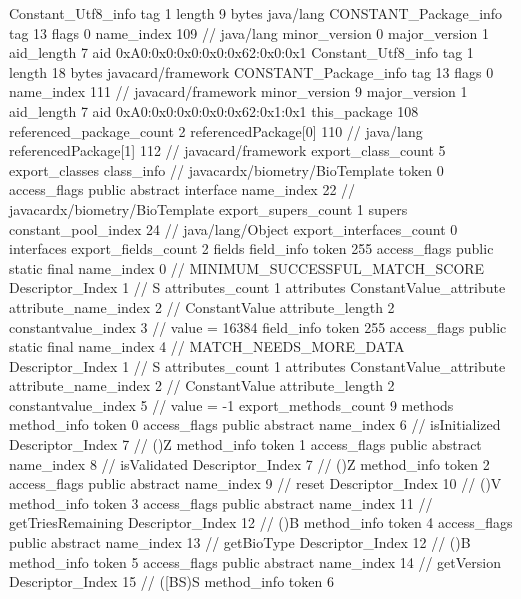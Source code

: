 {{{		}
		Constant_Utf8_info {
			tag	1
			length	9
			bytes	java/lang
		}
		CONSTANT_Package_info {
			tag	13
			flags	0
			name_index	109		// java/lang
			minor_version	0
			major_version	1
			aid_length	7
			aid	0xA0:0x0:0x0:0x0:0x62:0x0:0x1
		}
		Constant_Utf8_info {
			tag	1
			length	18
			bytes	javacard/framework
		}
		CONSTANT_Package_info {
			tag	13
			flags	0
			name_index	111		// javacard/framework
			minor_version	9
			major_version	1
			aid_length	7
			aid	0xA0:0x0:0x0:0x0:0x62:0x1:0x1
		}
	}
	this_package	108
	referenced_package_count	2
	referencedPackage[0]	110		// java/lang
	referencedPackage[1]	112		// javacard/framework
	export_class_count	5
	export_classes {
		class_info {		// javacardx/biometry/BioTemplate
			token	0
			access_flags	public abstract interface
			name_index	22		// javacardx/biometry/BioTemplate
			export_supers_count	1
			supers {
				constant_pool_index	24		// java/lang/Object
			}
			export_interfaces_count	0
			interfaces {
			}
			export_fields_count	2
			fields {
			field_info {
				token	255
				access_flags	public static final
				name_index	0		// MINIMUM_SUCCESSFUL_MATCH_SCORE
				Descriptor_Index	1		// S
				attributes_count	1
				attributes {
				ConstantValue_attribute {
					attribute_name_index	2		// ConstantValue
					attribute_length	2
					constantvalue_index	3		// value = 16384
				}
				}
			}
			field_info {
				token	255
				access_flags	public static final
				name_index	4		// MATCH_NEEDS_MORE_DATA
				Descriptor_Index	1		// S
				attributes_count	1
				attributes {
				ConstantValue_attribute {
					attribute_name_index	2		// ConstantValue
					attribute_length	2
					constantvalue_index	5		// value = -1
				}
				}
			}
			}
			export_methods_count	9
			methods {
				method_info {
					token	0
					access_flags	public abstract
					name_index	6		// isInitialized
					Descriptor_Index	7		// ()Z
				}
				method_info {
					token	1
					access_flags	public abstract
					name_index	8		// isValidated
					Descriptor_Index	7		// ()Z
				}
				method_info {
					token	2
					access_flags	public abstract
					name_index	9		// reset
					Descriptor_Index	10		// ()V
				}
				method_info {
					token	3
					access_flags	public abstract
					name_index	11		// getTriesRemaining
					Descriptor_Index	12		// ()B
				}
				method_info {
					token	4
					access_flags	public abstract
					name_index	13		// getBioType
					Descriptor_Index	12		// ()B
				}
				method_info {
					token	5
					access_flags	public abstract
					name_index	14		// getVersion
					Descriptor_Index	15		// ([BS)S
				}
				method_info {
					token	6
}}}}}

